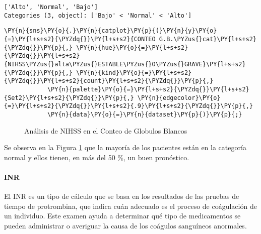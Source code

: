             \begin{tcolorbox}[breakable, size=fbox, boxrule=.5pt, pad at break*=1mm, opacityfill=0]
\begin{Verbatim}[commandchars=\\\{\}]
['Alto', 'Normal', 'Bajo']
Categories (3, object): ['Bajo' < 'Normal' < 'Alto']
\end{Verbatim}
\end{tcolorbox}
        
    \begin{tcolorbox}[breakable, size=fbox, boxrule=1pt, pad at break*=1mm,colback=cellbackground, colframe=cellborder]
\begin{Verbatim}[commandchars=\\\{\}]
\PY{n}{sns}\PY{o}{.}\PY{n}{catplot}\PY{p}{(}\PY{n}{y}\PY{o}{=}\PY{l+s+s2}{\PYZdq{}}\PY{l+s+s2}{CONTEO G.B.\PYZus{}cat}\PY{l+s+s2}{\PYZdq{}}\PY{p}{,} \PY{n}{hue}\PY{o}{=}\PY{l+s+s2}{\PYZdq{}}\PY{l+s+s2}{NIHSS\PYZus{}alta\PYZus{}ESTABLE\PYZus{}O\PYZus{}GRAVE}\PY{l+s+s2}{\PYZdq{}}\PY{p}{,} \PY{n}{kind}\PY{o}{=}\PY{l+s+s2}{\PYZdq{}}\PY{l+s+s2}{count}\PY{l+s+s2}{\PYZdq{}}\PY{p}{,}
            \PY{n}{palette}\PY{o}{=}\PY{l+s+s2}{\PYZdq{}}\PY{l+s+s2}{Set2}\PY{l+s+s2}{\PYZdq{}}\PY{p}{,} \PY{n}{edgecolor}\PY{o}{=}\PY{l+s+s2}{\PYZdq{}}\PY{l+s+s2}{.9}\PY{l+s+s2}{\PYZdq{}}\PY{p}{,}
            \PY{n}{data}\PY{o}{=}\PY{n}{dataset}\PY{p}{)}\PY{p}{;}
\end{Verbatim}
\end{tcolorbox}

\begin{center}
    	\begin{figure}[H]
	\centering
	\caption{Análisis de NIHSS en el Conteo de Globulos Blancos}
	\label{fig:aNISScg}
	\end{figure}
\end{center}
    
    Se observa en la Figura \ref{fig:aNISScg} que la mayoría de los pacientes están en la categoría normal y ellos tienen, en más del 50 \%, un buen pronóstico.

    \hypertarget{inr}{%
\paragraph{INR}\label{inr}}

El INR es un tipo de cálculo que se basa en los resultados de las pruebas de tiempo de protrombina, que indica cuán adecuado es el proceso de coágulación de un individuo. Este examen ayuda a determinar qué tipo de medicamentos se pueden administrar o averiguar la causa de los coágulos sanguíneos anormales.

